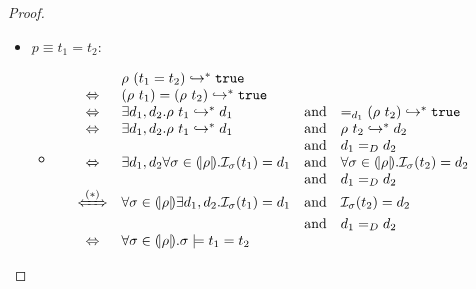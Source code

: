 \begin{proof}
\begin{itemize}
\item $p \equiv t_1 = t_2$:
\begin{itemize}
\item
$
\begin{array}{lclclcl}
	&&\evals{\rho\ (t_1 = t_2)}{\etrue} 
	\\&\Leftrightarrow&
	\evals{(\rho\ t_1) = (\rho\ t_2)}{\etrue} &&\\
	&\Leftrightarrow&
	\exists d_1, d_2.\evals{\rho\ t_1}{d_1} &\text{and}& \evals{=_{d_1} (\rho\ t_2)}{\etrue} &\\
	&\Leftrightarrow&
	\exists d_1, d_2.\evals{\rho\ t_1}{d_1} &\text{and}& \evals{\rho\ t_2}{d_2} \\
	&&&\text{and}& d_1 =_D d_2\\
	&\Leftrightarrow&
	\exists d_1, d_2\forall\sigmamodel\in\instance{\rho}.\interpIEq{\sigmamodel}{t_1}{d_1} &\text{and}& 
	\forall\sigmamodel\in\instance{\rho}.\interpIEq{\sigmamodel}{t_2}{d_2} \\&&&\text{and}& d_1 =_D d_2\\
	&\xLeftrightarrow{(*)}&
	\forall\sigmamodel\in\instance{\rho}\exists d_1, d_2.\interpIEq{\sigmamodel}{t_1}{d_1} &\text{and}& 
	\interpIEq{\sigmamodel}{t_2}{d_2} \\&&&\text{and}& d_1 =_D d_2\\
	&\Leftrightarrow&
	\forall\sigmamodel\in \instance{\rho}. \sigmamodel \models t_1 = t_2  &&\\
\end{array}
$


\end{itemize}
\end{itemize}
\end{proof}
